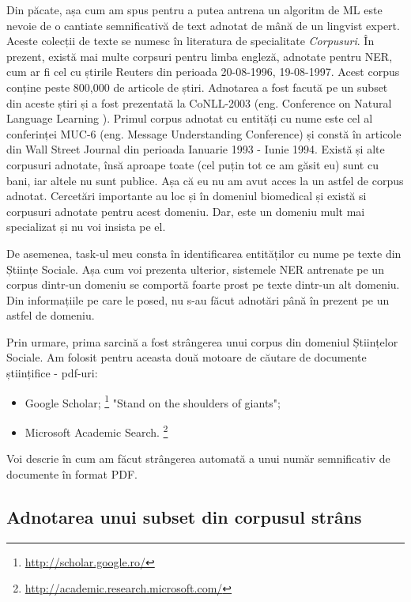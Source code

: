 Din păcate, așa cum am spus pentru a putea antrena un algoritm de ML este nevoie de o cantiate semnificativă de text adnotat de mână de un lingvist expert. Aceste colecții de texte se numesc în literatura de specialitate \textit{Corpusuri}. În prezent, există mai multe corpsuri pentru limba engleză, adnotate pentru NER, cum ar fi cel cu știrile Reuters din perioada 20-08-1996, 19-08-1997.\cite{rcv1} Acest corpus conține peste 800,000 de articole de știri. Adnotarea a fost facută pe un subset din aceste știri și a fost prezentată la CoNLL-2003\cite{conll2003} (eng. Conference on Natural Language Learning ). Primul corpus adnotat cu entități cu nume este cel al conferinței MUC-6 (eng. Message Understanding Conference) și constă în articole din Wall Street Journal din perioada Ianuarie 1993 - Iunie 1994.  Există și alte corpusuri adnotate, însă aproape toate (cel puțin tot ce am găsit eu) sunt cu bani, iar altele nu sunt publice. Așa că eu nu am avut acces la un astfel de corpus adnotat. Cercetări importante au loc și în domeniul biomedical și există si corpusuri adnotate pentru acest domeniu. Dar, este un domeniu mult mai specializat și nu voi insista pe el.

De asemenea, task-ul meu consta în identificarea entităților cu nume pe texte din Științe Sociale. Așa cum voi prezenta ulterior, sistemele NER antrenate pe un corpus dintr-un domeniu se comportă foarte prost pe texte dintr-un alt domeniu. Din informațiile pe care le posed, nu s-au făcut adnotări până în prezent pe un astfel de domeniu.

Prin urmare, prima sarcină a fost strângerea unui corpus din domeniul Științelor Sociale. Am folosit pentru aceasta două motoare de căutare de documente științifice - pdf-uri:

\begin{itemize}
\item Google Scholar; \footnote{\url{http://scholar.google.ro/}} "Stand on the shoulders of giants";
\item Microsoft Academic Search. \footnote{\url{http://academic.research.microsoft.com/}}
\end{itemize}

Voi descrie în  cum am făcut strângerea automată a unui număr semnificativ de documente în format PDF.

\subsection{Adnotarea unui subset din corpusul strâns}

